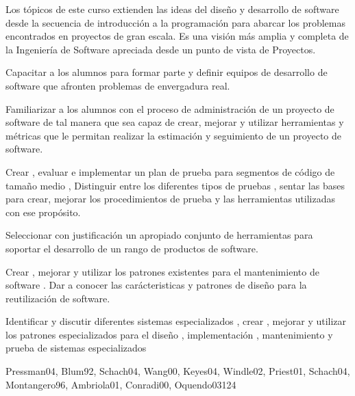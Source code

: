 \begin{syllabus}


\begin{justification}
Los tópicos de este curso extienden las ideas del diseño y desarrollo de software desde la secuencia de introducción a la programación para
abarcar los problemas encontrados en proyectos de gran escala. Es una visión más amplia y completa de la Ingeniería 
de Software apreciada desde un punto de vista de Proyectos.
\end{justification}

\begin{goals}
\item Capacitar a los alumnos para formar parte y definir equipos de desarrollo de software que afronten problemas de envergadura real.
\item Familiarizar a los alumnos con el proceso de administración de un proyecto de software de tal manera que sea capaz de crear, mejorar y utilizar herramientas y métricas que le permitan realizar la estimación y seguimiento de un proyecto de software.
\item Crear ,  evaluar e implementar un plan de prueba para segmentos de código de tamaño medio  , Distinguir entre los diferentes tipos de pruebas ,  sentar las bases para  crear, mejorar los procedimientos de prueba y las herramientas utilizadas con ese propósito.
\item Seleccionar con justificación un apropiado conjunto de herramientas para soportar el desarrollo de un rango de productos de software.
\item Crear , mejorar y utilizar  los patrones existentes para el mantenimiento de software . Dar a conocer las carácteristicas y patrones de diseño para la reutilización de software.
\item Identificar y discutir diferentes sistemas especializados , crear , mejorar y utilizar los patrones especializados para el diseño , implementación , mantenimiento y prueba   de sistemas especializados
\end{goals}

\begin{outcomes}
\end{outcomes}

\begin{unit}{\SESpecializedSystemsDef}{Pressman04, Blum92, Schach04, Wang00, Keyes04, Windle02, Priest01, Schach04, Montangero96, Ambriola01, Conradi00, Oquendo03}{12}{4}
   \SESpecializedSystemsAllTopics
   \SESpecializedSystemsAllObjectives
\end{unit}


\end{syllabus}
